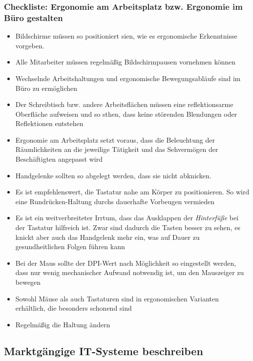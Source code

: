 \documentclass[a4paper, 12pt]{report}
\begin{document}
\begin{multicols}{2}
\subsubsection{Checkliste: Ergonomie am Arbeitsplatz bzw. Ergonomie im Büro
gestalten}

\begin{itemize}
    \item Bildschirme müssen so positioniert sien, wie es ergonomische
	Erkenntnisse vorgeben.
    \item Alle Mitarbeiter müssen regelmäßig Bildschirmpausen vornehmen können
    \item Wechselnde Arbeitshaltungen und ergonomische Bewegungsabläufe sind im
	Büro zu ermöglichen
    \item Der Schreibtisch bzw. andere Arbeitsflächen müssen eine
	reflektionsarme Oberfläche aufweisen und so sthen, dass keine störenden
	Blendungen oder Reflektionen entstehen
    \item Ergonomie am Arbeitsplatz setzt voraus, dass die Beleuchtung der
	Räumlichkeiten an die jeweilige Tätigkeit und das Sehvermögen der
	Beschäftigten angepasst wird
    \item Handgelenke sollten so abgelegt werden, dass sie nicht abknicken.
    \item Es ist empfehlenswert, die Tastatur nahe am Körper zu positionieren.
	So wird eine Rundrücken-Haltung durchs dauerhafte Vorbeugen vermieden
    \item Es ist ein weitverbreiteter Irrtum, dass das Ausklappen der
	\emph{Hinterfüße} bei der Tastatur hilfreich ist. Zwar sind dadurch die
	Tasten besser zu sehen, es knickt aber auch das Handgelenk mehr ein, was
	auf Dauer zu gesundheitlichen Folgen führen kann
    \item Bei der Maus sollte der DPI-Wert nach Möglichkeit so eingestellt
	werden, dass nur wenig mechanischer Aufwand notwendig ist, um den
	Mauszeiger zu bewegen
    \item Sowohl Mäuse als auch Tastaturen sind in ergonomischen Varianten
	erhältlich, die besonders schonend sind
    \item Regelmäßig die Haltung ändern
\end{itemize}

\subsection{Marktgängige IT-Systeme beschreiben}


\end{multicols}
\end{document}
